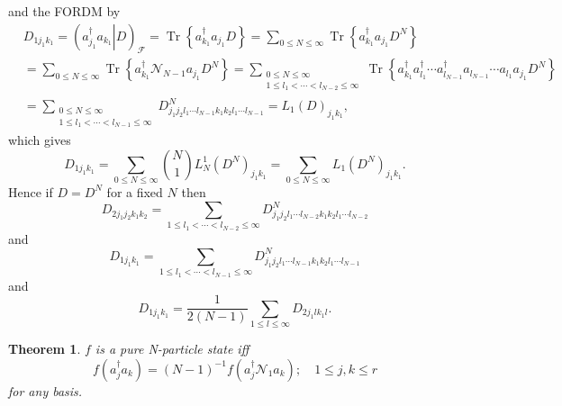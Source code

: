 \documentclass[aps,preprint]{revtex4}%
\newtheorem{theorem}{Theorem}
\begin{document}
and the FORDM by%
\begin{align}
&  D_{1j_{1}k_{1}}=\left(  \left.  a_{j_{1}}^{\dagger}a_{k_{1}}\right\vert
D\right)  _{\mathcal{F}}=\operatorname{Tr}\left\{  a_{k_{1}}^{\dagger}%
a_{j_{1}}D\right\}  =\sum_{0\leq N\leq\infty}\operatorname{Tr}\left\{
a_{k_{1}}^{\dagger}a_{j_{1}}D^{N}\right\}  \nonumber\\
&  =\sum_{0\leq N\leq\infty}\operatorname{Tr}\left\{  a_{k_{1}}^{\dagger
}\mathcal{N}_{N-1}a_{j_{1}}D^{N}\right\}  =\sum_{\substack{0\leq N\leq
\infty\\1\leq l_{1}<\cdots<l_{N-2}\leq\infty}}\operatorname{Tr}\left\{
a_{k_{1}}^{\dagger}a_{l_{1}}^{\dagger}\cdots a_{l_{N-1}}^{\dagger}a_{l_{N-1}%
}\cdots a_{l_{1}}a_{j_{1}}D^{N}\right\}  \nonumber\\
&  =\sum_{\substack{0\leq N\leq\infty\\1\leq l_{1}<\cdots<l_{N-1}\leq\infty
}}D_{j_{1}j_{2}l_{1}\cdots l_{N-1}k_{1}k_{2}l_{1}\cdots l_{N-1}}^{N}%
=L_{1}\left(  D\right)  _{j_{1}k_{1}},
\end{align}
which gives%
\begin{equation}
D_{1j_{1}k_{1}}=\sum_{0\leq N\leq\infty}\binom{N}{1}L_{N}^{1}\left(
D^{N}\right)  _{j_{1}k_{1}}=\sum_{0\leq N\leq\infty}L_{1}\left(  D^{N}\right)
_{j_{1}k_{1}}.
\end{equation}
Hence if $D=D^{N}$ for a fixed $N$ then
\begin{equation}
D_{2j_{1}j_{2}k_{1}k_{2}}=\sum_{1\leq l_{1}<\cdots<l_{N-2}\leq\infty}%
D_{j_{1}j_{2}l_{1}\cdots l_{N-2}k_{1}k_{2}l_{1}\cdots l_{N-2}}^{N}%
\end{equation}
and
\begin{equation}
D_{1j_{1}k_{1}}=\sum_{1\leq l_{1}<\cdots<l_{N-1}\leq\infty}D_{j_{1}j_{2}%
l_{1}\cdots l_{N-1}k_{1}k_{2}l_{1}\cdots l_{N-1}}^{N}%
\end{equation}
and
\begin{equation}
D_{1j_{1}k_{1}}=\frac{1}{2\left(  N-1\right)  }\sum_{1\leq l\leq\infty
}D_{2j_{1}lk_{1}l}.
\end{equation}


\begin{theorem}
$f$ is a pure N-particle state iff
\begin{equation}
f\left(  a_{j}^{\dagger}a_{k}\right)  =\left(  N-1\right)  ^{-1}f\left(
a_{j}^{\dagger}\mathcal{N}_{1}a_{k}\right)  ;\quad1\leq j,k\leq r \label{N-1}%
\end{equation}
for any basis.
\end{theorem}
\end{document}

